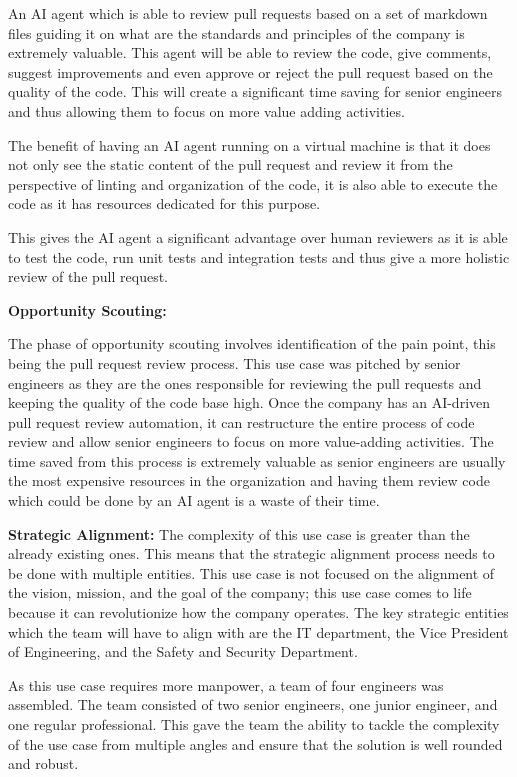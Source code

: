 \documentclass[]{imc-inf}
\begin{document}
An AI agent which is able to review pull requests based on a set of markdown files guiding it on what are the standards and principles of the company is extremely valuable. This agent will be able to review the code, give comments, suggest improvements and even approve or reject the pull request based on the quality of the code. This will create a significant time saving for senior engineers and thus allowing them to focus on more value adding activities.

The benefit of having an AI agent running on a virtual machine is that it does not only see the static content of the pull request and review it from the perspective of linting and organization of the code, it is also able to execute the code as it has resources dedicated for this purpose.

This gives the AI agent a significant advantage over human reviewers as it is able to test the code, run unit tests and integration tests and thus give a more holistic review of the pull request.

\textbf{Opportunity Scouting:}

The phase of opportunity scouting involves identification of the pain point, this being the pull request review process. This use case was pitched by senior engineers as they are the ones responsible for reviewing the pull requests and keeping the quality of the code base high. Once the company has an AI-driven pull request review automation, it can restructure the entire process of code review and allow senior engineers to focus on more value-adding activities. The time saved from this process is extremely valuable as senior engineers are usually the most expensive resources in the organization and having them review code which could be done by an AI agent is a waste of their time.

\textbf{Strategic Alignment:}
The complexity of this use case is greater than the already existing ones. This means that the strategic alignment process needs to be done with multiple entities. This use case is not focused on the alignment of the vision, mission, and the goal of the company; this use case comes to life because it can revolutionize how the company operates. The key strategic entities which the team will have to align with are the IT department, the Vice President of Engineering, and the Safety and Security Department. 

As this use case requires more manpower, a team of four engineers was assembled. The team consisted of two senior engineers, one junior engineer, and one regular professional. This gave the team the ability to tackle the complexity of the use case from multiple angles and ensure that the solution is well rounded and robust.
\end{document}
